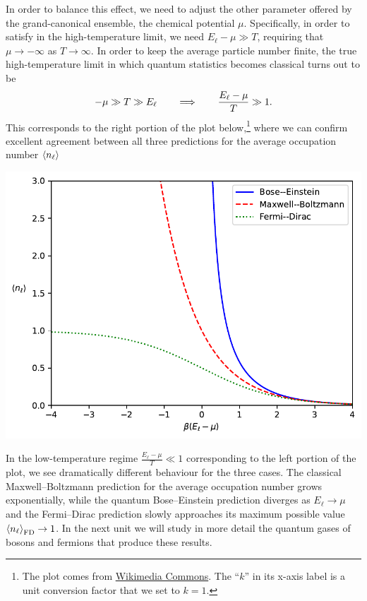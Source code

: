 In order to balance this effect, we need to adjust the other parameter offered by the grand-canonical ensemble, the chemical potential $\mu$.
Specifically, in order to satisfy  in the high-temperature limit, we need $E_{\ell} - \mu \gg T$, requiring that $\mu \to -\infty$ as $T \to \infty$.
In order to keep the average particle number finite, the true high-temperature limit in which quantum statistics becomes classical turns out to be
\begin{equation}
  -\mu \gg T \gg E_{\ell} \qquad \Longrightarrow \qquad \frac{E_{\ell} - \mu}{T} \gg 1.
\end{equation}
This corresponds to the right portion of the plot below,\footnote{The plot comes from \href{https://commons.wikimedia.org/wiki/File:Fermi-Dirac_Bose-Einstein_Maxwell-Boltzmann_statistics.svg}{Wikimedia Commons}.  The ``$k$'' in its x-axis label is a unit conversion factor that we set to $k = 1$.} where we can confirm excellent agreement between all three predictions for the average occupation number $\left\langle n_{\ell} \right\rangle$

\begin{center}\includegraphics[width=\textwidth]{figs/unit07_dist.pdf}\end{center}

In the low-temperature regime $\frac{E_{\ell} - \mu}{T} \ll 1$ corresponding to the left portion of the plot, we see dramatically different behaviour for the three cases.
The classical Maxwell--Boltzmann prediction for the average occupation number grows exponentially, while the quantum Bose--Einstein prediction diverges as $E_{\ell} \to \mu$ and the Fermi--Dirac prediction slowly approaches its maximum possible value $\left\langle n_{\ell} \right\rangle_{\text{FD}} \to 1$.
In the next unit we will study in more detail the quantum gases of bosons and fermions that produce these results.
